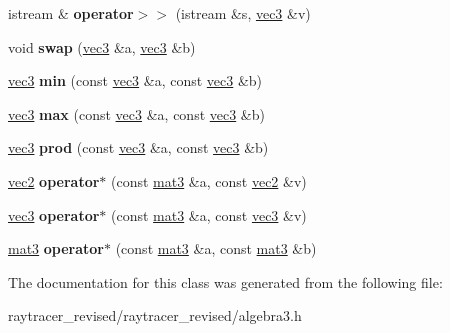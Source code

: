 \begin{DoxyCompactItemize}
\item 
\hypertarget{classvec3_ae9a9c0d5062c3fb77cc7eece44ea2359}{
istream \& {\bfseries operator$>$$>$} (istream \&s, \hyperlink{classvec3}{vec3} \&v)}
\label{classvec3_ae9a9c0d5062c3fb77cc7eece44ea2359}

\item 
\hypertarget{classvec3_a38e0e5495e938b737df81f5b46748fc6}{
void {\bfseries swap} (\hyperlink{classvec3}{vec3} \&a, \hyperlink{classvec3}{vec3} \&b)}
\label{classvec3_a38e0e5495e938b737df81f5b46748fc6}

\item 
\hypertarget{classvec3_a37000e8707c2dc2884c66acfc90070aa}{
\hyperlink{classvec3}{vec3} {\bfseries min} (const \hyperlink{classvec3}{vec3} \&a, const \hyperlink{classvec3}{vec3} \&b)}
\label{classvec3_a37000e8707c2dc2884c66acfc90070aa}

\item 
\hypertarget{classvec3_ac730605b60c117ec79c1c74cb2269a1d}{
\hyperlink{classvec3}{vec3} {\bfseries max} (const \hyperlink{classvec3}{vec3} \&a, const \hyperlink{classvec3}{vec3} \&b)}
\label{classvec3_ac730605b60c117ec79c1c74cb2269a1d}

\item 
\hypertarget{classvec3_aa4e6ac89db67a3ca3f78380dac421502}{
\hyperlink{classvec3}{vec3} {\bfseries prod} (const \hyperlink{classvec3}{vec3} \&a, const \hyperlink{classvec3}{vec3} \&b)}
\label{classvec3_aa4e6ac89db67a3ca3f78380dac421502}

\item 
\hypertarget{classvec3_a307ae299187b6d9e75b1a7730b6213c2}{
\hyperlink{classvec2}{vec2} {\bfseries operator$\ast$} (const \hyperlink{classmat3}{mat3} \&a, const \hyperlink{classvec2}{vec2} \&v)}
\label{classvec3_a307ae299187b6d9e75b1a7730b6213c2}

\item 
\hypertarget{classvec3_a46bbeb7eed270ad69b34c3a1b93eb050}{
\hyperlink{classvec3}{vec3} {\bfseries operator$\ast$} (const \hyperlink{classmat3}{mat3} \&a, const \hyperlink{classvec3}{vec3} \&v)}
\label{classvec3_a46bbeb7eed270ad69b34c3a1b93eb050}

\item 
\hypertarget{classvec3_a0df0a7a0901cee5daec15003ee3594fc}{
\hyperlink{classmat3}{mat3} {\bfseries operator$\ast$} (const \hyperlink{classmat3}{mat3} \&a, const \hyperlink{classmat3}{mat3} \&b)}
\label{classvec3_a0df0a7a0901cee5daec15003ee3594fc}

\end{DoxyCompactItemize}


The documentation for this class was generated from the following file:\begin{DoxyCompactItemize}
\item 
raytracer\_\-revised/raytracer\_\-revised/algebra3.h\end{DoxyCompactItemize}
